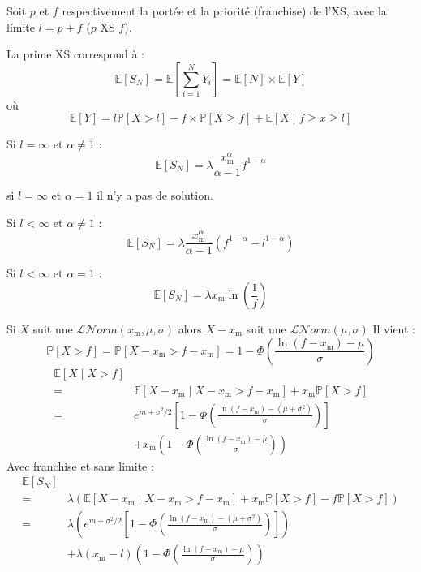 \begin{f}
Soit \(p\) et \(f\) respectivement la portée et la priorité (franchise) de l'XS, avec la limite \(l=p+f\) (\(p\) XS \(f\)).

La prime XS correspond à :
\[
\mathbb{E}\left[S_N\right]=\mathbb{E}\left[\sum_{i=1}^{N} Y_{i}\right]=\mathbb{E}[N]\times \mathbb{E}[Y]
\]
où
\[
\mathbb{E}[Y]= l \mathbb{P}[X>l] - f \times \mathbb{P}[X\geq f] + \mathbb{E}[X\mid f\geq x\geq l]
\]


Si \(l=\infty\) et \(\alpha \neq 1\) :
\[
\mathbb{E}[S_N] = \lambda \frac{x_\mathrm{m}^{\alpha}}{\alpha -1}f^{1-\alpha} 
\]

si  \(l=\infty\) et \(\alpha = 1\) il n'y a pas de solution.

Si \(l<\infty\) et \(\alpha \neq 1\) :
\[
\mathbb{E}[S_N] = \lambda \frac{x_\mathrm{m}^{\alpha}}{\alpha -1}\left( f^{1-\alpha} -l^{1-\alpha} \right)
\]

Si \(l<\infty\) et \(\alpha = 1\) :
\[
\mathbb{E}[S_N] = \lambda x_\mathrm{m} \ln \left(  \frac{1}{f}\right)
\]
\end{f}



\begin{f}

Si \(X\) suit une \(\mathcal{L}\mathcal{N}orm(x_\mathrm{m}, \mu, \sigma)\) alors \(X-x_\mathrm{m}\) suit une \(\mathcal{L}\mathcal{N}orm(\mu, \sigma)\)
Il vient :
\[
\mathbb{P}[X>f]=\mathbb{P}[X-x_\mathrm{m}>f-x_\mathrm{m}]=1-\Phi\left(\frac{\ln(f-x_\mathrm{m})-\mu}{\sigma}\right)
\]
\begin{align*}
	\mathbb{E}[X\mid X>f] \\ 
	= & \mathbb{E}\left[ X-x_\mathrm{m}\mid X-x_\mathrm{m}>f-x_\mathrm{m} \right]+x_\mathrm{m} \mathbb{P}[X>f]\\
	= & e ^{m+\sigma^2/2} \left[1-\Phi\left(\frac{\ln(f-x_\mathrm{m})-(\mu+\sigma^2)}{\sigma}\right) \right]\\
	& +x_\mathrm{m} \left( 1-\Phi\left(\frac{\ln(f-x_\mathrm{m})-\mu}{\sigma}\right) \right)
\end{align*}
Avec franchise et sans limite :
\begin{align*}
	\mathbb{E}[S_N] \\ 
	= & \lambda \left(\mathbb{E}\left[ X-x_\mathrm{m}\mid X-x_\mathrm{m}>f-x_\mathrm{m} \right]+x_\mathrm{m} \mathbb{P}[X>f]-f\mathbb{P}[X>f]\right)\\
	= & \lambda \left(  e ^{m+\sigma^2/2} \left[1-\Phi\left(\frac{\ln(f-x_\mathrm{m})-(\mu+\sigma^2)}{\sigma}\right) \right]\right)\\
	& +\lambda (x_\mathrm{m}-l) \left( 1-\Phi\left(\frac{\ln(f-x_\mathrm{m})-\mu}{\sigma}\right) \right)
\end{align*}

\end{f}